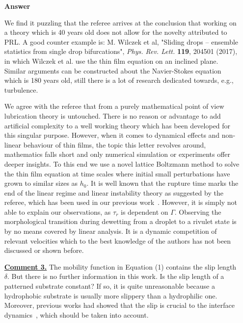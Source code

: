 \documentclass[12pt,english]{article}
\begin{document}
\begin{itemize}
\item[ \textbf{{Answer}}]
{
We find it puzzling that the referee arrives at the conclusion that working on a theory which is 40 years old does not allow for the novelty attributed to PRL.
A good counter example is: M. Wilczek et al,
"Sliding drops – ensemble statistics from single drop bifurcations", {\it Phys. Rev. Lett.} {\bf 119}, 204501 (2017), in which Wilczek et al. use the thin film equation on an inclined plane.
Similar arguments can be constructed about the Navier-Stokes equation which is 180 years old, still there is a lot of research dedicated towards, e.g., turbulence.

We agree with the referee that from a purely mathematical point of view lubrication theory is untouched.
There is no reason or advantage to add artificial complexity to a well working theory which has been developed for this singular purpose.
However, when it comes to dynamical effects and non-linear behaviour of thin films, the topic this letter revolves around, mathematics falls short and only numerical simulation or experiments offer deeper insights.
To this end we use a novel lattice Boltzmann method to solve the thin film equation at time scales where initial small perturbations have grown to similar sizes as $h_0$.
It is well known that the rupture time marks the end of the linear regime and linear instability theory as suggested by the referee, which has been used in our previous work~\cite{PhysRevE.104.034801}. 
However, it is simply not able to explain our observations, as $\tau_r$ is dependent on $\Gamma$. 
Observing the morphological transition during dewetting from a droplet to a rivulet state is by no means covered by linear analysis. 
It is a dynamic competition of relevant velocities which to the best knowledge of the authors has not been discussed or shown before.
}

\item[ \textbf{\underline{Comment 3.}}]
{
The mobility function in Equation (1) contains the slip length $\delta$. 
But there is no further information in this work. 
Is the slip length of a patterned substrate constant? 
If so, it is quite unreasonable because a hydrophobic substrate is usually more slippery than a hydrophilic one. 
Moreover, previous works had showed that the slip is crucial to the interface dynamics~\cite{zhang_sprittles_lockerby_2021, zhao_zhang_si_2023}, which should be taken into account.
}


\end{itemize}
\end{document}
